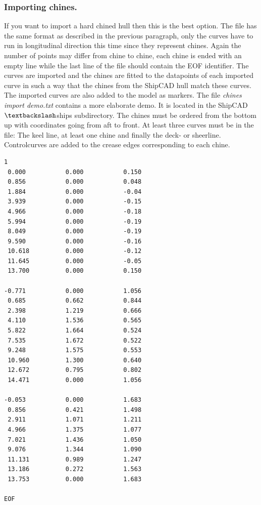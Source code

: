 \documentclass[12pt]{article}
\begin{document}
\subsubsection{Importing chines.}
If you want to import a hard chined hull then this is the best
option. The file has the same format as described in the previous
paragraph, only the curves have to run in longitudinal direction this
time since they represent chines. Again the number of points may
differ from chine to chine, each chine is ended with an empty line
while the last line of the file should contain the EOF identifier.
The curves are imported and the chines are fitted to the datapoints of
each imported curve in such a way that the chines from the ShipCAD
hull match these curves.  The imported curves are also added to the
model as markers. The file \textit{chines import demo.txt} contains a
more elaborate demo. It is located in the ShipCAD$\textbackslash$ships
subdirectory. The chines must be ordered from the bottom up with
coordinates going from aft to front. At least three curves must be in
the file: The keel line, at least one chine and finally the deck- or
sheerline. Controlcurves are added to the crease edges corresponding
to each chine.

\begin{verbatim}
1
 0.000           0.000           0.150
 0.856           0.000           0.048
 1.884           0.000           -0.04
 3.939           0.000           -0.15
 4.966           0.000           -0.18
 5.994           0.000           -0.19
 8.049           0.000           -0.19
 9.590           0.000           -0.16
 10.618          0.000           -0.12
 11.645          0.000           -0.05
 13.700          0.000           0.150
 
-0.771           0.000           1.056
 0.685           0.662           0.844
 2.398           1.219           0.666
 4.110           1.536           0.565
 5.822           1.664           0.524
 7.535           1.672           0.522
 9.248           1.575           0.553
 10.960          1.300           0.640
 12.672          0.795           0.802
 14.471          0.000           1.056
 
-0.053           0.000           1.683
 0.856           0.421           1.498
 2.911           1.071           1.211
 4.966           1.375           1.077
 7.021           1.436           1.050
 9.076           1.344           1.090
 11.131          0.989           1.247
 13.186          0.272           1.563
 13.753          0.000           1.683

EOF
\end{verbatim}
\end{document}
